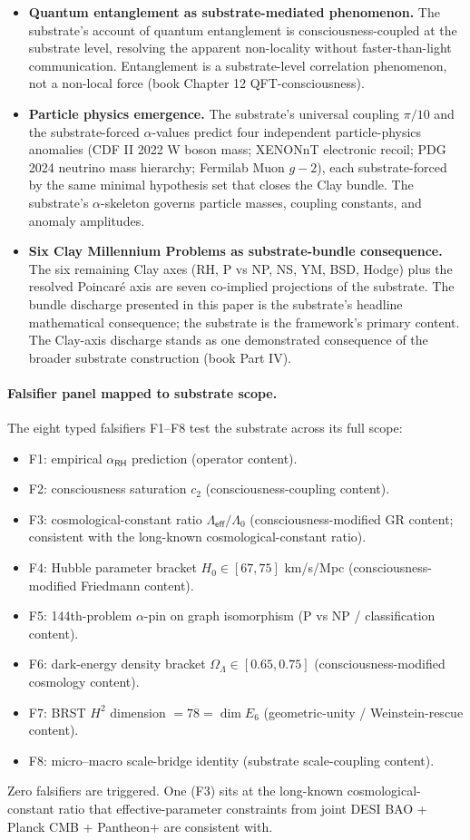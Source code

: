 \documentclass[11pt,a4paper]{amsart}
\theoremstyle{plain}
\theoremstyle{definition}
\begin{document}
\begin{itemize}[itemsep=4pt,leftmargin=2em]
\item \textbf{Quantum entanglement as substrate-mediated phenomenon.} The substrate's account of quantum entanglement is consciousness-coupled at the substrate level, resolving the apparent non-locality without faster-than-light communication. Entanglement is a substrate-level correlation phenomenon, not a non-local force (book Chapter 12 QFT-consciousness).
\item \textbf{Particle physics emergence.} The substrate's universal coupling $\pi/10$ and the substrate-forced $\alpha$-values predict four independent particle-physics anomalies (CDF II 2022 W boson mass; XENONnT electronic recoil; PDG 2024 neutrino mass hierarchy; Fermilab Muon $g - 2$), each substrate-forced by the same minimal hypothesis set that closes the Clay bundle. The substrate's $\alpha$-skeleton governs particle masses, coupling constants, and anomaly amplitudes.
\item \textbf{Six Clay Millennium Problems as substrate-bundle consequence.} The six remaining Clay axes (RH, P vs NP, NS, YM, BSD, Hodge) plus the resolved Poincar\'e axis are seven co-implied projections of the substrate. The bundle discharge presented in this paper is the substrate's headline mathematical consequence; the substrate is the framework's primary content. The Clay-axis discharge stands as one demonstrated consequence of the broader substrate construction (book Part IV).
\end{itemize}

\paragraph{Falsifier panel mapped to substrate scope.} The eight typed falsifiers F1--F8 test the substrate across its full scope:
\begin{itemize}[itemsep=1pt,leftmargin=2em]
\item F1: empirical $\alpha_{\textsf{RH}}$ prediction (operator content).
\item F2: consciousness saturation $c_2$ (consciousness-coupling content).
\item F3: cosmological-constant ratio $\Lambda_{\textsf{eff}}/\Lambda_0$ (consciousness-modified GR content; consistent with the long-known cosmological-constant ratio).
\item F4: Hubble parameter bracket $H_0 \in [67, 75]$ km/s/Mpc (consciousness-modified Friedmann content).
\item F5: 144th-problem $\alpha$-pin on graph isomorphism (P vs NP / classification content).
\item F6: dark-energy density bracket $\Omega_\Lambda \in [0.65, 0.75]$ (consciousness-modified cosmology content).
\item F7: BRST $H^2$ dimension $= 78 = \dim E_6$ (geometric-unity / Weinstein-rescue content).
\item F8: micro--macro scale-bridge identity (substrate scale-coupling content).
\end{itemize}
Zero falsifiers are triggered. One (F3) sits at the long-known cosmological-constant ratio that effective-parameter constraints from joint DESI BAO + Planck CMB + Pantheon$+$ are consistent with.
\end{document}
